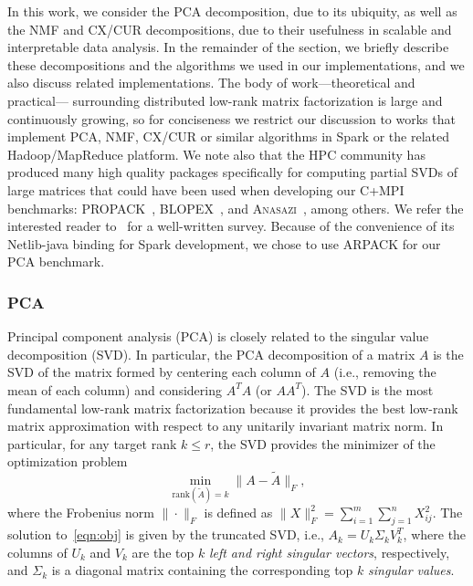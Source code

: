 In this work, we consider the PCA decomposition, due to its ubiquity, as well as the NMF and CX/CUR decompositions, due to their usefulness in scalable and interpretable data analysis. In the remainder of the section, we briefly describe these decompositions and the algorithms we used in our implementations, and we also discuss related implementations. The body of work---theoretical and practical--- surrounding distributed low-rank matrix factorization is large and continuously growing, so for conciseness we restrict our discussion to works that implement PCA, NMF, CX/CUR or similar algorithms in Spark or the related Hadoop/MapReduce platform. We note also that the HPC community has produced many high quality packages specifically for computing partial SVDs of large matrices that could have been used when  developing our C+MPI benchmarks: PROPACK~\cite{larsen1998lanczos}, BLOPEX~\cite{blopex2007}, and \textsc{Anasazi}~\cite{baker2009anasazi}, among others. We refer the interested reader to~\cite{hernandez2009survey} for a well-written survey. Because of the convenience of its Netlib-java binding for Spark development, we chose to use \textsc{ARPACK} for our PCA benchmark.

\subsubsection{PCA} 
Principal component analysis (PCA) is closely related to the singular value decomposition (SVD).
In particular, the PCA decomposition of a matrix $A$ is the SVD of the matrix formed by centering each column of $A$ (i.e., removing the mean of each column) and considering $A^TA$ (or $AA^T$).
The SVD is the most fundamental low-rank matrix factorization because it provides the best low-rank matrix approximation with respect to any unitarily invariant matrix norm.
In particular, for any target rank $k \leq r$, the SVD provides the minimizer of the optimization problem
\begin{equation}
 \label{eqn:obj}
  \min_{\text{rank}(\tilde A) = k} \| A - \tilde A \|_F,
\end{equation}
where the Frobenius norm $\| \cdot \|_F$ is defined as $\|X\|_F^2 =
\sum_{i=1}^m \sum_{j=1}^n X_{ij}^2 $.
The solution
to~\eqref{eqn:obj} is given by the truncated SVD, i.e., $A_k = U_k \Sigma_k
V_k^T$, where the columns of $U_k$ and $V_k$ are the top $k$ {\it left and right singular vectors}, respectively, and $\Sigma_k$ is a 
diagonal matrix containing the corresponding top $k$ {\it singular values}.


